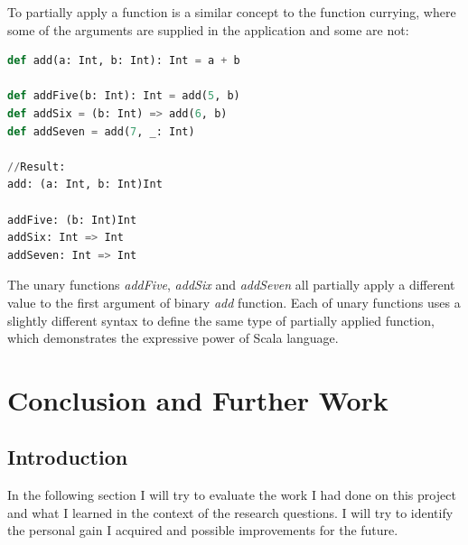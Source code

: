 \documentclass[12pt,twoside,a4paper]{report}
\begin{document}
To partially apply a function is a similar concept to the function currying, where some of the arguments are supplied in the application and some are not:
\begin{lstlisting}[language=python]
def add(a: Int, b: Int): Int = a + b
  
def addFive(b: Int): Int = add(5, b)
def addSix = (b: Int) => add(6, b)
def addSeven = add(7, _: Int)

//Result:
add: (a: Int, b: Int)Int

addFive: (b: Int)Int
addSix: Int => Int
addSeven: Int => Int
\end{lstlisting}

The unary functions \emph{addFive}, \emph{addSix} and \emph{addSeven} all partially apply a different value to the first argument of binary \emph{add} function. Each of unary functions uses a slightly different syntax to define the same type of partially applied function, which demonstrates the expressive power of Scala language.















\chapter{Conclusion and Further Work}\label{7}

\section{Introduction}\label{7.1}
In the following section I will try to evaluate the work I had done on this project and what I learned in the context of the research questions. I will try to identify the personal gain I acquired and possible improvements for the future.

\end{document}
